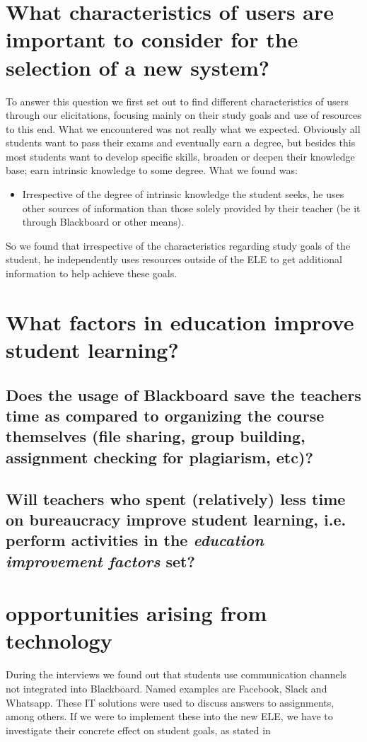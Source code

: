 \section{What characteristics of users are important to consider for the selection of a new system?}
To answer this question we first set out to find different characteristics of users through our elicitations, focusing mainly on their study goals and use of resources to this end. What we encountered was not really what we expected. Obviously all students want to pass their exams and eventually earn a degree, but besides this most students want to develop specific skills, broaden or deepen their knowledge base; earn intrinsic knowledge to some degree. What we found was:
\begin{itemize}
	\item Irrespective of the degree of intrinsic knowledge the student seeks, he uses other sources of information than those solely provided by their teacher (be it through Blackboard or other means).
\end{itemize}
So we found that irrespective of the characteristics regarding study goals of the student, he independently uses resources outside of the ELE to get additional information to help achieve these goals.

\section{What factors in education improve student learning?}
\subsection{Does the usage of Blackboard save the teachers time as compared to organizing the course themselves (file sharing, group building, assignment checking for plagiarism, etc)?}
\label{ss_1}
\subsection{Will teachers who spent (relatively) less time on bureaucracy improve student learning, i.e. perform activities in the \textit{education improvement factors} set?}
\label{ss_2}

\section{opportunities arising from technology}
During the interviews we found out that students use communication channels not integrated into Blackboard. Named examples are Facebook, Slack and Whatsapp. These IT solutions were used to discuss answers to assignments, among others. If we were to implement these into the new ELE, we have to investigate their concrete effect on student goals, as stated in 

